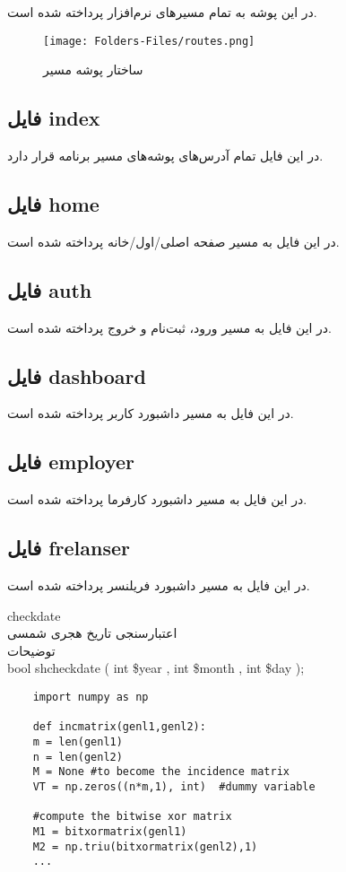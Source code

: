 در این پوشه به تمام مسیر‌های نرم‌افزار پرداخته شده است.

\begin{figure}[H]
	\texttt{[image: Folders-Files/routes.png]}
	\centering
	\caption{ساختار پوشه مسیر}
	\label{fig:folder-routes}
\end{figure}

\subsection{فایل index}
در این فایل تمام آدرس‌های پوشه‌های مسیر برنامه قرار دارد.

\subsection{فایل home}
در این فایل به مسیر صفحه اصلی/اول/خانه پرداخته شده است.

\subsection{فایل auth}
در این فایل به مسیر ورود، ثبت‌نام و خروج پرداخته شده است.

\subsection{فایل dashboard}
در این فایل به مسیر داشبورد کاربر پرداخته شده است.

\subsection{فایل employer}
در این فایل به مسیر داشبورد کارفرما پرداخته شده است.

\subsection{فایل frelanser}
در این فایل به مسیر داشبورد فریلنسر پرداخته شده است.



checkdate
\\
 اعتبارسنجی تاریخ هجری شمسی
\\
توضیحات
\\
bool shcheckdate ( int \$year , int \$month , int \$day );

\begin{verbatim}
	import numpy as np
	
	def incmatrix(genl1,genl2):
	m = len(genl1)
	n = len(genl2)
	M = None #to become the incidence matrix
	VT = np.zeros((n*m,1), int)  #dummy variable
	
	#compute the bitwise xor matrix
	M1 = bitxormatrix(genl1)
	M2 = np.triu(bitxormatrix(genl2),1) 
	...
\end{verbatim}

